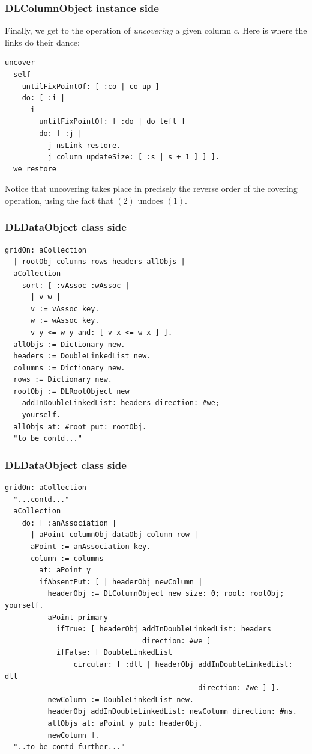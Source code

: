 \documentclass{beamer}
\begin{document}
\begin{frame}[fragile]
\frametitle{DLColumnObject instance side}
Finally, we get to the operation of \textit{uncovering} a given column $c$. 
Here is where the links do their dance:
\begin{verbatim}
uncover
  self
    untilFixPointOf: [ :co | co up ]
    do: [ :i | 
      i
        untilFixPointOf: [ :do | do left ]
        do: [ :j | 
          j nsLink restore.
          j column updateSize: [ :s | s + 1 ] ] ].
  we restore
\end{verbatim}
Notice that uncovering takes place in precisely the reverse order of the 
covering operation, using the fact that $(2)$ undoes $(1)$.
\end{frame}

\begin{frame}[fragile]
\frametitle{DLDataObject class side}
\begin{verbatim}
gridOn: aCollection
  | rootObj columns rows headers allObjs |
  aCollection
    sort: [ :vAssoc :wAssoc | 
      | v w |
      v := vAssoc key.
      w := wAssoc key.
      v y <= w y and: [ v x <= w x ] ].
  allObjs := Dictionary new.
  headers := DoubleLinkedList new.
  columns := Dictionary new.
  rows := Dictionary new.
  rootObj := DLRootObject new
    addInDoubleLinkedList: headers direction: #we;
    yourself.
  allObjs at: #root put: rootObj.
  "to be contd..."
\end{verbatim}
\end{frame}

\begin{frame}[fragile]
\frametitle{DLDataObject class side}
\begin{verbatim}
gridOn: aCollection
  "...contd..."
  aCollection
    do: [ :anAssociation | 
      | aPoint columnObj dataObj column row |
      aPoint := anAssociation key.
      column := columns
        at: aPoint y
        ifAbsentPut: [ | headerObj newColumn |
          headerObj := DLColumnObject new size: 0; root: rootObj; yourself.
          aPoint primary
            ifTrue: [ headerObj addInDoubleLinkedList: headers 
                                direction: #we ]
            ifFalse: [ DoubleLinkedList
                circular: [ :dll | headerObj addInDoubleLinkedList: dll 
                                             direction: #we ] ].
          newColumn := DoubleLinkedList new.
          headerObj addInDoubleLinkedList: newColumn direction: #ns.
          allObjs at: aPoint y put: headerObj.
          newColumn ].
  "..to be contd further..."
\end{verbatim}
\end{frame}
\end{document}
